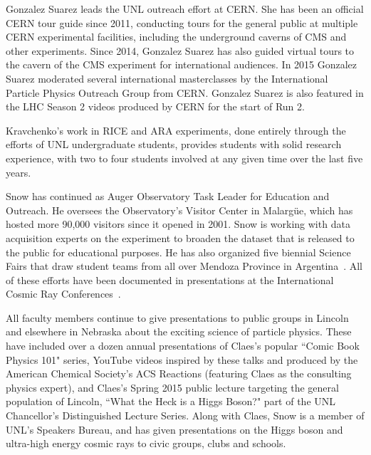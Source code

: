 Gonzalez Suarez leads the UNL outreach effort at CERN. She has been an official CERN tour guide since 2011, conducting tours for the general public at multiple CERN experimental facilities, including the underground caverns of CMS and other experiments. Since 2014, Gonzalez Suarez has also guided virtual tours to the cavern of the CMS experiment for international audiences. In 2015 Gonzalez Suarez moderated several international masterclasses by the International Particle Physics Outreach Group from CERN. Gonzalez Suarez is also featured in the LHC Season 2 videos produced by CERN for the start of Run 2.

Kravchenko's work in RICE and ARA experiments, done entirely through the efforts of UNL undergraduate students, provides students with solid research experience, with two to four students involved at any given time over the last five years.  

Snow has continued as Auger Observatory Task Leader for Education and Outreach.  He oversees the Observatory's Visitor Center in Malarg\"{u}e, which has hosted more 90,000 visitors since it opened in 2001.  Snow is working with data acquisition experts on the experiment to broaden the dataset that is released to the public for educational purposes.  He has also organized five biennial Science Fairs that draw student teams from all over Mendoza Province in Argentina~\cite{bib:fairphotos}.  All of these efforts have been documented in presentations at the International Cosmic Ray Conferences~\cite{bib:ICRCoutreach}.

All faculty members continue to give presentations to public groups in Lincoln and elsewhere in Nebraska about the exciting science of particle physics. These have included over a dozen annual presentations of Claes's popular ``Comic Book Physics 101" series, YouTube videos inspired by these talks and produced by the American Chemical Society's ACS Reactions (featuring Claes as the consulting physics expert), and Claes's Spring 2015 public lecture targeting the general population of Lincoln, ``What the Heck is a Higgs Boson?" part of the UNL Chancellor's Distinguished Lecture Series.  Along with Claes, Snow is a member of UNL's Speakers Bureau, and has given presentations on the Higgs boson and ultra-high energy cosmic rays to civic groups, clubs and schools.

